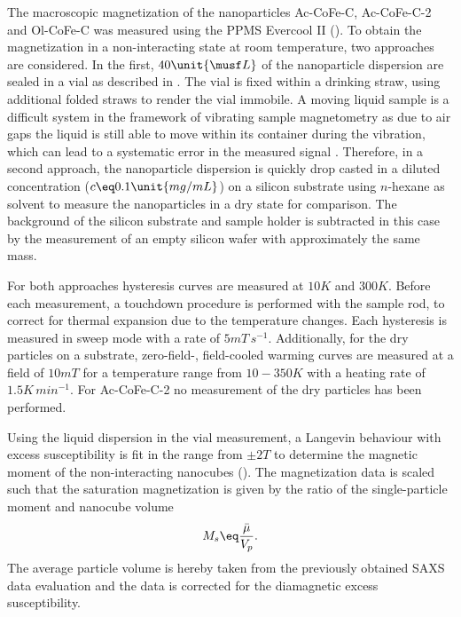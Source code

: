 \documentclass[\main/dresen_thesis.tex]{subfiles}
\begin{document}
    The macroscopic magnetization of the nanoparticles Ac-CoFe-C, Ac-CoFe-C-2 and Ol-CoFe-C was measured using the PPMS Evercool II ().
    To obtain the magnetization in a non-interacting state at room temperature, two approaches are considered.
    In the first, $40 \unit{\musf L}$ of the nanoparticle dispersion are sealed in a vial as described in .
    The vial is fixed within a drinking straw, using additional folded straws to render the vial immobile.
    A moving liquid sample is a difficult system in the framework of vibrating sample magnetometry as due to air gaps the liquid is still able to move within its container during the vibration, which can lead to a systematic error in the measured signal \cite{Boekelheide_2016_Artif}.
    Therefore, in a second approach, the nanoparticle dispersion is quickly drop casted in a diluted concentration ($c \eq 0.1 \unit{mg/mL}$) on a silicon substrate using $\textit{n}$-hexane as solvent to measure the nanoparticles in a dry state for comparison.
    The background of the silicon substrate and sample holder is subtracted in this case by the measurement of an empty silicon wafer with approximately the same mass.

    For both approaches hysteresis curves are measured at $10 \unit{K}$ and $300 \unit{K}$.
    Before each measurement, a touchdown procedure is performed with the sample rod, to correct for thermal expansion due to the temperature changes.
    Each hysteresis is measured in sweep mode with a rate of $5 \unit{mT \, s^{-1}}$.
    Additionally, for the dry particles on a substrate, zero-field-, field-cooled warming curves are measured at a field of $10 \unit{mT}$ for a temperature range from $10 - 350 \unit{K}$ with a heating rate of $1.5 \unit{K \, min^{-1}}$.
    For Ac-CoFe-C-2 no measurement of the dry particles has been performed.

    Using the liquid dispersion in the vial measurement, a Langevin behaviour with excess susceptibility is fit in the range from $\pm 2 \unit{T}$ to determine the magnetic moment of the non-interacting nanocubes ().
    The magnetization data is scaled such that the saturation magnetization is given by the ratio of the single-particle moment and nanocube volume
    \begin{align}
      M_s \eq \frac{\bar{\mu}}{V_p}.
    \end{align}
    The average particle volume is hereby taken from the previously obtained SAXS data evaluation and the data is corrected for the diamagnetic excess susceptibility.
\end{document}
